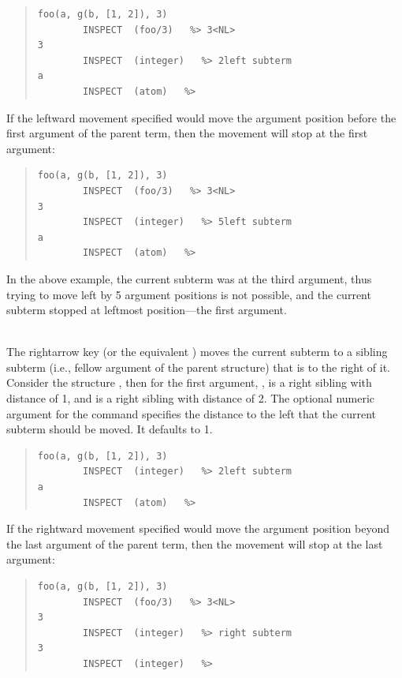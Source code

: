 \begin{descr}{1cm}
\begin{quote}
\begin{verbatim}
foo(a, g(b, [1, 2]), 3)
        INSPECT  (foo/3)   %> 3<NL>
3
        INSPECT  (integer)   %> 2left subterm
a
        INSPECT  (atom)   %>
\end{verbatim}
\end{quote}

If the leftward movement specified would move the argument position before the
first argument of the parent term, then the movement will stop at the first
argument:


\begin{quote}
\begin{verbatim}
foo(a, g(b, [1, 2]), 3)
        INSPECT  (foo/3)   %> 3<NL>
3
        INSPECT  (integer)   %> 5left subterm
a
        INSPECT  (atom)   %>
\end{verbatim}
\end{quote}

In the above example, the current subterm was at the third argument, thus
trying to move left by 5 argument positions is not possible, and
the current subterm stopped at leftmost position---the first argument.

\\
The rightarrow key (or the equivalent ) moves the current subterm
to a sibling subterm (i.e., fellow argument of the parent structure) that is
to the right of it. Consider the structure ,
then for the first argument, ,  is a right
sibling with distance of 1, and  is a right sibling with distance
of 2. The optional numeric argument for the command specifies the distance
to the left that the current subterm should be moved. It defaults to 1.

\begin{quote}
\begin{verbatim}
foo(a, g(b, [1, 2]), 3)
        INSPECT  (integer)   %> 2left subterm
a
        INSPECT  (atom)   %>
\end{verbatim}
\end{quote}

If the rightward movement specified would move the argument position beyond
the last argument of the parent term, then the movement will stop at the
last argument:

\begin{quote}
\begin{verbatim}
foo(a, g(b, [1, 2]), 3)
        INSPECT  (foo/3)   %> 3<NL>
3
        INSPECT  (integer)   %> right subterm
3
        INSPECT  (integer)   %>
\end{verbatim}
\end{quote}


\end{descr}
